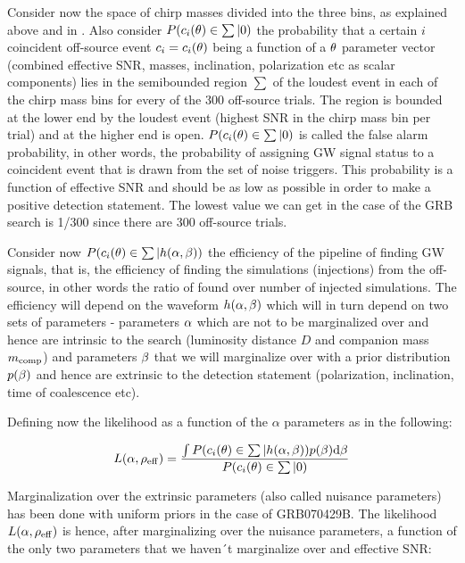 \documentclass[epsf]{article}
\begin{document}
Consider now the space of chirp masses divided into the three bins, as explained above and in \cite{grb}. Also consider $P(c_i({\bf \theta}) \in \sum|0)$ the probability that a certain $i$ coincident off-source event $c_i=c_i({\bf \theta})$ being a function of a ${\bf \theta}$ parameter vector (combined effective SNR, masses, inclination, polarization etc as scalar components) lies in the semibounded region $\sum$ of the loudest event in each of the chirp mass bins for every of the 300 off-source trials. The region is bounded at the lower end by the loudest event (highest SNR in the chirp mass bin per trial) and at the higher end is open. $P(c_i({\bf \theta}) \in \sum|0)$ is called the false alarm probability, in other words, the probability of assigning GW signal status to a coincident event that is drawn from the set of noise triggers. This probability is a function of effective SNR and should be as low as possible in order to make a positive detection statement. The lowest value we can get in the case of the GRB search is 1/300 since there are 300 off-source trials.

Consider now  $P(c_i({\bf \theta}) \in \sum|h({\bf \alpha}, {\bf \beta}))$ the efficiency of the pipeline of finding GW signals, that is, the efficiency of finding the simulations (injections) from the off-source, in other words the ratio of found over number of injected simulations.  The efficiency will depend on the waveform  $h({\bf \alpha}, {\bf \beta})$ which will in turn depend on two sets of parameters - parameters ${\bf \alpha}$ which are not to be marginalized over and hence are intrinsic to the search (luminosity distance $D$ and companion mass $m_{{\rm comp}}$)  and parameters ${\bf \beta}$ that we will marginalize over with a prior distribution $p({\bf \beta})$ and hence are extrinsic to the detection statement (polarization, inclination, time of coalescence etc). 

Defining now the likelihood as a function of the $\alpha$ parameters as in the following:

\begin{equation}
L({\bf \alpha}, \rho_{{\rm eff}})= \frac {\int P(c_i({\bf \theta}) \in \sum|h({\bf \alpha}, {\bf \beta})) p({\bf \beta}) {\rm d} {\bf \beta}}{P(c_i({\bf \theta}) \in \sum|0)}
\end{equation}

Marginalization over the extrinsic parameters (also called nuisance parameters) has been done with uniform priors in the case of GRB070429B. The likelihood  $L({\bf \alpha}, \rho_{{\rm eff}})$ is hence, after marginalizing over the nuisance parameters, a function of the only two parameters that we haven´t marginalize over and effective SNR:
\end{document}
